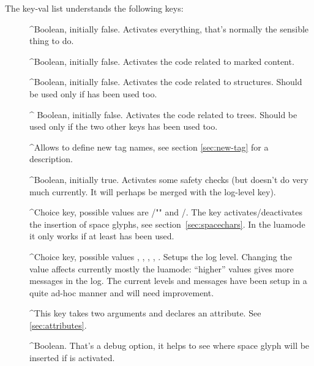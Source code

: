 \documentclass[DIV=12,parskip=half-,bibliography=totoc]{scrartcl}
\begin{document}
\TagP The key-val list understands the following keys:\TagPend
\begin{description}
\item[]
 \TagP^Boolean, initially false. Activates everything, that's normally the sensible thing to do.\Pmeti
\item[]
 \TagP^Boolean, initially false. Activates the code related to marked content.\Pmeti
\item[]
 \TagP^Boolean, initially false. Activates the code related to structures. Should be used only if  has been used too.\Pmeti
\item[]
\TagP^ Boolean, initially false. Activates the code related to trees. Should be used only if the two other keys has been used too.\Pmeti
\item[]
 \TagP^Allows to define new tag names, see section \ref{sec:new-tag} for a description.\Pmeti
\item[]
 \TagP^Boolean, initially true. Activates some safety checks (but doesn't do very much currently. It will perhaps be merged with the log-level key).\Pmeti
\item[]
 \TagP^Choice key, possible values are /"" and /. The key activates/deactivates the insertion of space glyphs, see section~\ref{sec:spacechars}. In the luamode it only works if at least  has been used.\Pmeti
\item[]
 \TagP^Choice key, possible values , , , ,  .  Setups the log level.  Changing the value affects currently mostly the luamode: \enquote{higher} values gives more messages in the log. The current levels and messages have been setup in a quite ad-hoc manner and will need improvement.\Pmeti
\item[]
 \TagP^This key takes two arguments and declares an attribute. See \ref{sec:attributes}.\Pmeti
\item[]
\TagP^Boolean. That's a debug option, it helps to see where space glyph will be inserted if  is activated.\Pmeti
\item[]

\end{description}
\end{document}
